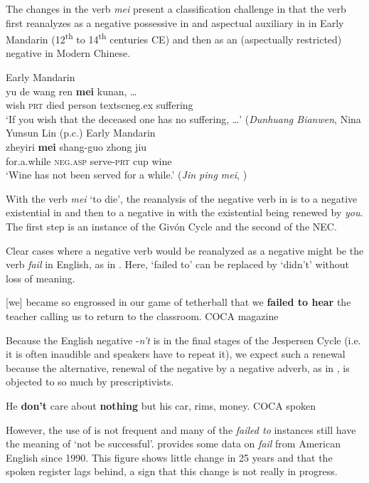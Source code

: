 \documentclass[output=paper,draft,draftmode,colorlinks,citecolor=brown]{langscibook}
\begin{document}
The changes in the verb \textit{mei} present a classification challenge in
that the verb first reanalyzes as a negative possessive in
and aspectual auxiliary in  in Early Mandarin
(12\textsuperscript{th} to 14\textsuperscript{th} centuries CE) and then as
an (aspectually restricted) negative in Modern Chinese. 

\begin{exe}\ex Early Mandarin \label{ex:other-mandarin-suffer}\\
    \gll yu  de  wang  ren  \textbf{mei}    kunan, \ldots{}    \\
wish  \textsc{prt}  died  person  textsc{neg.ex}   suffering \\
    \glt `If you wish that the deceased one has no suffering, \ldots' 
  (\textit{Dunhuang Bianwen}, Nina Yunsun Lin (p.c.)
    \ex Early Mandarin \label{ex:other-mandarin-wine}\\
    \gll zheyiri    \textbf{mei}    shang-guo  zhong  jiu \\
  for.a.while  \textsc{neg.asp}  serve-\textsc{prt}  cup  wine \\
    \glt `Wine has not been served for a while.' (\textit{Jin ping mei},
    \citealt[200]{Shi2002}) 
    \end{exe} 
%
With the verb \textit{mei} `to die', the reanalysis of the negative verb in
 is to a negative existential in
 and then to a negative in
 with the existential being renewed by
\textit{you}. The first step is an instance of the Givón Cycle and the second
of the NEC. 

Clear cases where a negative verb would be reanalyzed as a negative might
be the verb \textit{fail} in English, as in .
Here, `failed to' can be replaced by `didn't' without loss of meaning.
%
\begin{exe}\ex \label{ex:other-english-fail}
      [we] became so engrossed in our game of tetherball that we
      \textbf{failed to hear} the teacher calling us to return to the classroom. {\ob}COCA magazine{\cb}
    \end{exe}
%
Because the English negative -\textit{n't} is in the final stages of the
Jespersen Cycle (i.e. it is often inaudible and speakers have to repeat
it), we expect such a renewal because the alternative, renewal of the
negative by a negative adverb, as in , is objected to so
much by prescriptivists. 
%
\begin{exe}\ex \label{ex:other-english-care}
      He \textbf{don't} care about \textbf{nothing} but his car, rims,
      money. {\ob}COCA spoken{\cb} 
      \end{exe}
%
However, the use of  is not frequent and many of
the \textit{failed to} instances still have the meaning of `not be
successful'.  provides some data on \textit{fail} from
American English since 1990. This figure shows little change in 25 years
and that the spoken register lags behind, a sign that this change is not
really in progress.
\end{document}
